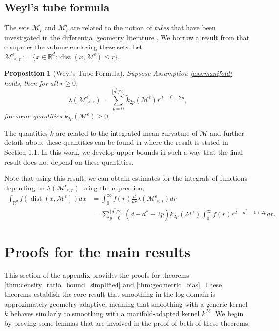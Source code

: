 \documentclass[10pt]{article}
\theoremstyle{plain}
\newtheorem{proposition}[theorem]{Proposition}
\theoremstyle{definition}
\theoremstyle{remark}
\newcommand{\M}{{\mathcal{M}}}
\newcommand{\R}{\mathbb{R}}
\newcommand{\dist}{\operatorname{dist}}
\begin{document}
\subsection{Weyl's tube formula}\label{app:weyl}

The sets \(\M_r\) and \(\M^\epsilon_r\) are related to the notion of \textit{tubes} that have been investigated in the differential geometry literature \citep{Gray2004-rz, Weyl1939-ne}. We borrow a result from \cite{Weyl1939-ne} that computes the volume enclosing these sets. Let \(\M^\epsilon_{\leq r} := \{x \in \R^d: \dist(x, \M^\epsilon) \leq r\}\).
\begin{proposition}[Weyl's Tube Formula]\label{prop:weyl}
Suppose Assumption \ref{ass:manifold} holds, then for all \(r \geq 0\),
\begin{equation*}
    \lambda(\M^\epsilon_{\leq r}) = \sum_{p=0}^{\lfloor d^*/2 \rfloor} \tilde{k}_{2p}(\M^\epsilon) r^{d-d^*+2p},
\end{equation*}
for some quantities \(\tilde{k}_{2p}(\M^\epsilon) \geq 0\).
\end{proposition}
The quantities \(\tilde{k}\) are related to the integrated mean curvature of \(\M\) and further details about these quantities can be found in \citep{Gray2004-rz} where the result is stated in Section 1.1. In this work, we develop upper bounds in such a way that the final result does not depend on these quantities.

Note that using this result, we can obtain estimates for the integrals of functions depending on  \(\lambda(\M^\epsilon_{\leq r})\) using the expression,
\begin{align}
    \int_{\R^d} f(\dist(x, \M^\epsilon)) dx &= \int_0^\infty f(r) \frac{d}{dr} \lambda(\M^\epsilon_{\leq r}) dr \nonumber\\
    &= \sum_{p=0}^{\lfloor d^*/2 \rfloor} (d-d^*+2p) \tilde{k}_{2p}(\M^\epsilon) \int_0^\infty f(r) r^{d-d^*-1+2p} dr.\label{eq:weyl_int}
\end{align}

\section{Proofs for the main results}
This section of the appendix provides the proofs for theorems \ref{thm:density_ratio_bound_simplified} and \ref{thm:geometric_bias}. These theorems establish the core result that smoothing in the log-domain is approximately geometry-adaptive, meaning that smoothing with a generic kernel $k$ behaves similarly to smoothing with a manifold-adapted kernel $k^\M$. We begin by proving some lemmas that are involved in the proof of both of these theorems.
\end{document}
